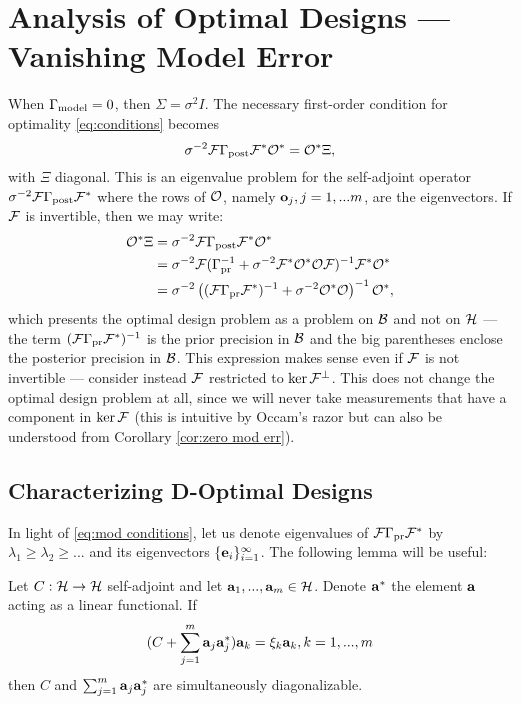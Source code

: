 \documentclass{amsart}
\numberwithin{equation}{section}
\begin{document}
\section{Analysis of Optimal Designs --- Vanishing Model Error}\label{section:vanishing}
When $\Gamma_{\textup{model}} = 0$, then $\Sigma= \sigma^2I$. The necessary
first-order condition for optimality \eqref{eq:conditions} becomes
\begin{equation}\label{eq:eigenproblem}
  \sigma^{-2}\mathcal{F} \Gamma_{\textup{post}} \mathcal{F}^* \mathcal{O}^* = \mathcal{O}^* \Xi, 
\end{equation}
with $\Xi$ diagonal. This is an eigenvalue problem for the
self-adjoint operator $\sigma^{-2}\mathcal{F} \Gamma_{\textup{post}} \mathcal{F}^*$ where the rows
of $\mathcal{O}$, namely $\mathbf{o}_j,j=1,...m$, are the eigenvectors. If $\mathcal{F}$
is invertible, then we may write:
\begin{align}\label{eq:mod conditions}
  \begin{split}
  \mathcal{O}^* \Xi &= \sigma^{-2}\mathcal{F} \Gamma_{\textup{post}} \mathcal{F}^* \mathcal{O}^*  \\
  &= \sigma^{-2} \mathcal{F}( \Gamma_{\textup{pr}}^{-1} + \sigma^{-2}  \mathcal{F}^* \mathcal{O}^* \mathcal{O} \mathcal{F} )^{-1} \mathcal{F}^* \mathcal{O}^* \\
  &= \sigma^{-2} \left ( (\mathcal{F}\Gamma_{\textup{pr}}\mathcal{F}^*)^{-1} + \sigma^{-2}  \mathcal{O}^* \mathcal{O} \right )^{-1} \mathcal{O}^*,
  \end{split}
\end{align}  
which presents the optimal design problem as a problem on $\mathcal{B}$ and
not on $\mathcal{H}$ --- the term $(\mathcal{F} \Gamma_{\textup{pr}} \mathcal{F}^*)^{-1}$ is the prior
precision in $\mathcal{B}$ and the big parentheses enclose the posterior
precision in $\mathcal{B}$. This expression makes sense even if $\mathcal{F}$ is not
invertible --- consider instead $\mathcal{F}$ restricted to $\ker
\mathcal{F}^{\perp}$. This does not change the optimal design problem at
all, since we will never take measurements that have a component in
$\ker \mathcal{F}$ (this is intuitive by Occam's razor but can also be
understood from Corollary \ref{cor:zero mod err}).

\subsection{Characterizing D-Optimal Designs}\label{subsub:characterization}
In light of \eqref{eq:mod conditions}, let us denote eigenvalues of
$\mathcal{F} \Gamma_{\textup{pr}} \mathcal{F}^*$ by $\lambda_1 \geq \lambda_2 \geq ...$ and its
eigenvectors $\{\mathbf{e}_i\}_{i=1}^{\infty}$. The following lemma will be useful:

\begin{lemma}\label{lemma:sim diag}
  Let $C:\mathcal{H} \to \mathcal{H}$ self-adjoint and let $\mathbf{a}_1,...,\mathbf{a}_m \in
  \mathcal{H}$. Denote $\mathbf{a}^*$ the element $\mathbf{a}$ acting as a linear
  functional. If
  \begin{equation*}
   (C + \sum_{j=1}^m \mathbf{a}_j\mathbf{a}_j^*) \mathbf{a}_k = \xi_k \mathbf{a}_k, k = 1,...,m
  \end{equation*}
  then $C$ and $\sum_{j=1}^m \mathbf{a}_j \mathbf{a}_j^*$ are simultaneously
  diagonalizable.
\end{lemma}
\end{document}
